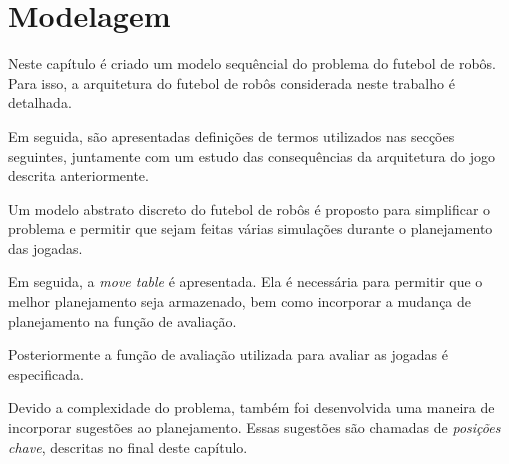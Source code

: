 \chapter{Modelagem}\label{cap:modelagem}

Neste capítulo é criado um modelo sequêncial do problema do futebol
de robôs. Para isso, a arquitetura do futebol de robôs considerada
neste trabalho é detalhada. 

Em seguida, são apresentadas definições de termos utilizados nas
secções seguintes, juntamente com um estudo das consequências da
arquitetura do jogo descrita anteriormente.

Um modelo abstrato discreto do futebol de robôs é proposto para simplificar
o problema e permitir que sejam feitas várias simulações durante o
planejamento das jogadas. 

Em seguida, a \textit{move table} é apresentada. Ela é necessária para
permitir que o melhor planejamento seja armazenado, bem como incorporar
a mudança de planejamento na função de avaliação.

Posteriormente a função de avaliação utilizada para avaliar as jogadas
é especificada.

Devido a complexidade do problema, também foi desenvolvida uma maneira de
incorporar sugestões ao planejamento. Essas sugestões são chamadas de
\textit{posições chave}, descritas no final deste capítulo.








